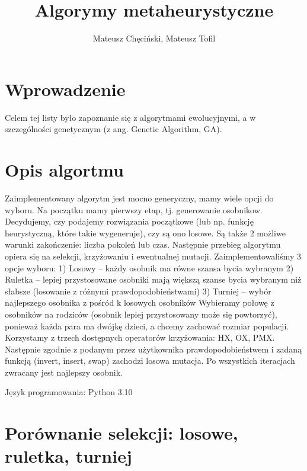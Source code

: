 \documentclass{article}
\begin{document}
    \begin{titlepage}
        \title{Algorymy metaheurystyczne}
        \author{Mateusz Chęciński, Mateusz Tofil}
        \maketitle
    \end{titlepage}

    \section{Wprowadzenie}

    Celem tej listy było zapoznanie się z algorytmami ewolucyjnymi, a w szczególności
    genetycznym (z ang. Genetic Algorithm, GA).

    \section{Opis algortmu}

   Zaimplementowany algorytm jest mocno generyczny, mamy wiele opcji do wyboru.
   Na początku mamy pierwszy etap, tj. generowanie osobnikow.
   Decydujemy, czy podajemy rozwiązania początkowe
   (lub np. funkcję heurystyczną, które takie wygeneruje), czy są
   ono losowe. Są także 2 możliwe warunki zakończenie:
   liczba pokoleń lub czas.
   Następnie przebieg algorytmu opiera się na selekcji, krzyżowaniu i
   ewentualnej mutacji.
   Zaimplementowaliśmy 3 opcje wyboru:
   1) Losowy – każdy osobnik ma równe szansa bycia wybranym
   2) Ruletka – lepiej przystosowane osobniki mają większą szanse bycia wybranym niż słabsze
   (losowanie z różnymi prawdopodobieństwami)
   3) Turniej – wybór najlepszego osobnika z pośród k losowych osobników
   Wybieramy połowę z osobników na rodziców (osobnik lepiej przystosowany
   może się powtorzyć), ponieważ każda para ma dwójkę dzieci, a chcemy
   zachować rozmiar populacji.
   Korzystamy z trzech dostępnych operatorów krzyżowania: HX, OX, PMX.
   Następnie zgodnie z podanym przez użytkownika prawdopodobieństwem
   i zadaną funkcją (invert, insert, swap) zachodzi losowa mutacja.
   Po wszystkich iteracjach zwracany jest najlepszy osobnik.

    \noindent Język programowania: Python 3.10

     \section{Porównanie selekcji: losowe, ruletka, turniej}
\end{document}
